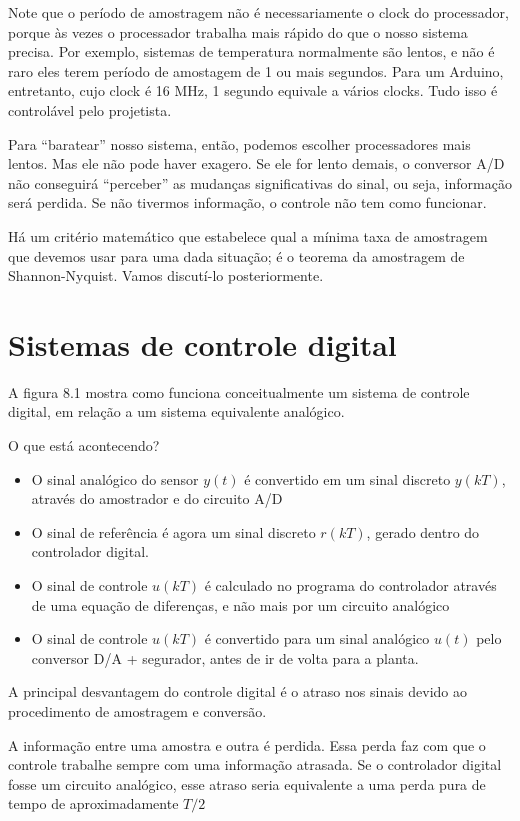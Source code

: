 \documentclass[
]{book}
\providecommand{\tightlist}{%
  \setlength{\itemsep}{0pt}\setlength{\parskip}{0pt}}
\begin{document}
Note que o período de amostragem não é necessariamente o clock do processador, porque às vezes o processador trabalha mais rápido do que o nosso sistema precisa. Por exemplo, sistemas de temperatura normalmente são lentos, e não é raro eles terem período de amostagem de 1 ou mais segundos. Para um Arduino, entretanto, cujo clock é 16 MHz, 1 segundo equivale a vários clocks. Tudo isso é controlável pelo projetista.

Para ``baratear'' nosso sistema, então, podemos escolher processadores mais lentos. Mas ele não pode haver exagero. Se ele for lento demais, o conversor A/D não conseguirá ``perceber'' as mudanças significativas do sinal, ou seja, informação será perdida. Se não tivermos informação, o controle não tem como funcionar.

Há um critério matemático que estabelece qual a mínima taxa de amostragem que devemos usar para uma dada situação; é o teorema da amostragem de Shannon-Nyquist. Vamos discutí-lo posteriormente.

\hypertarget{sistemas-de-controle-digital}{%
\section{Sistemas de controle digital}\label{sistemas-de-controle-digital}}

A figura 8.1 mostra como funciona conceitualmente um sistema de controle digital, em relação a um sistema equivalente analógico.

O que está acontecendo?

\begin{itemize}
\tightlist
\item
  O sinal analógico do sensor \(y(t)\) é convertido em um sinal discreto \(y(kT)\), através do amostrador e do circuito A/D
\item
  O sinal de referência é agora um sinal discreto \(r(kT)\), gerado dentro do controlador digital.
\item
  O sinal de controle \(u(kT)\) é calculado no programa do controlador através de uma equação de diferenças, e não mais por um circuito analógico
\item
  O sinal de controle \(u(kT)\) é convertido para um sinal analógico \(u(t)\) pelo conversor D/A + segurador, antes de ir de volta para a planta.
\end{itemize}

A principal desvantagem do controle digital é o atraso nos sinais devido ao procedimento de amostragem e conversão.

A informação entre uma amostra e outra é perdida. Essa perda faz com que o controle trabalhe sempre com uma informação atrasada. Se o controlador digital fosse um circuito analógico, esse atraso seria equivalente a uma perda pura de tempo de aproximadamente \(T/2\)

  
\end{document}
